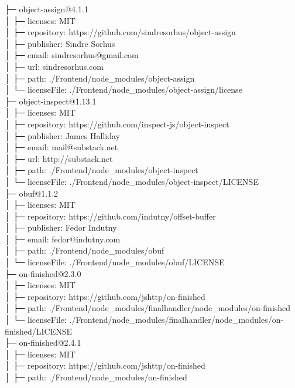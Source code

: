 ├─ object-assign@4.1.1\\
│  ├─ licenses: MIT\\
│  ├─ repository: https://github.com/sindresorhus/object-assign\\
│  ├─ publisher: Sindre Sorhus\\
│  ├─ email: sindresorhus@gmail.com\\
│  ├─ url: sindresorhus.com\\
│  ├─ path: ./Frontend/node\_modules/object-assign\\
│  └─ licenseFile: ./Frontend/node\_modules/object-assign/license\\
├─ object-inspect@1.13.1\\
│  ├─ licenses: MIT\\
│  ├─ repository: https://github.com/inspect-js/object-inspect\\
│  ├─ publisher: James Halliday\\
│  ├─ email: mail@substack.net\\
│  ├─ url: http://substack.net\\
│  ├─ path: ./Frontend/node\_modules/object-inspect\\
│  └─ licenseFile: ./Frontend/node\_modules/object-inspect/LICENSE\\
├─ obuf@1.1.2\\
│  ├─ licenses: MIT\\
│  ├─ repository: https://github.com/indutny/offset-buffer\\
│  ├─ publisher: Fedor Indutny\\
│  ├─ email: fedor@indutny.com\\
│  ├─ path: ./Frontend/node\_modules/obuf\\
│  └─ licenseFile: ./Frontend/node\_modules/obuf/LICENSE\\
├─ on-finished@2.3.0\\
│  ├─ licenses: MIT\\
│  ├─ repository: https://github.com/jshttp/on-finished\\
│  ├─ path: ./Frontend/node\_modules/finalhandler/node\_modules/on-finished\\
│  └─ licenseFile: ./Frontend/node\_modules/finalhandler/node\_modules/on-finished/LICENSE\\
├─ on-finished@2.4.1\\
│  ├─ licenses: MIT\\
│  ├─ repository: https://github.com/jshttp/on-finished\\
│  ├─ path: ./Frontend/node\_modules/on-finished\\
